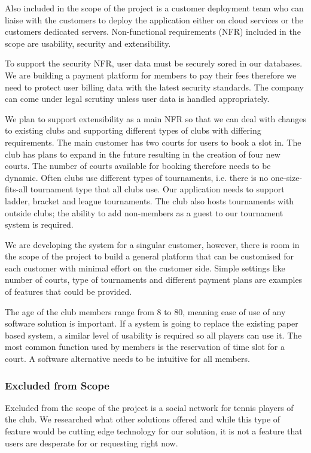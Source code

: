 Also included in the scope of the project is a customer deployment team who can liaise with the customers to deploy the application either on cloud services or the customers dedicated servers.
Non-functional requirements (NFR) included in the scope are usability, security and extensibility.

To support the security NFR, user data must be securely sored in our databases. We are building a payment platform for members to pay their fees therefore we need to protect user billing data with the latest security standards. The company can come under legal scrutiny unless user data is handled appropriately.

We plan to support extensibility as a main NFR so that we can deal with changes to existing clubs and supporting different types of clubs with differing requirements. The main customer has two courts for users to book a slot in. The club has plans to expand in the future resulting in the creation of four new courts. The number of courts available for booking therefore needs to be dynamic. Often clubs use different types of tournaments, i.e. there is no one-size-fits-all tournament type that all clubs use. Our application needs to support ladder, bracket and league tournaments. The club also hosts tournaments with outside clubs; the ability to add non-members as a guest to our tournament system is required.

We are developing the system for a singular customer, however, there is room in the scope of the project to build a general platform that can be customised for each customer with minimal effort on the customer side. Simple settings like number of courts, type of tournaments and different payment plans are examples of features that could be provided.

The age of the club members range from 8 to 80, meaning ease of use of any software solution is important. If a system is going to replace the existing paper based system, a similar level of usability is required so all players can use it. The most common function used by members is the reservation of time slot for a court. A software alternative needs to be intuitive for all members.

\subsubsection{Excluded from Scope}

Excluded from the scope of the project is a social network for tennis players of the club. We researched what other solutions offered and while this type of feature would be cutting edge technology for our solution, it is not a feature that users are desperate for or requesting right now.


